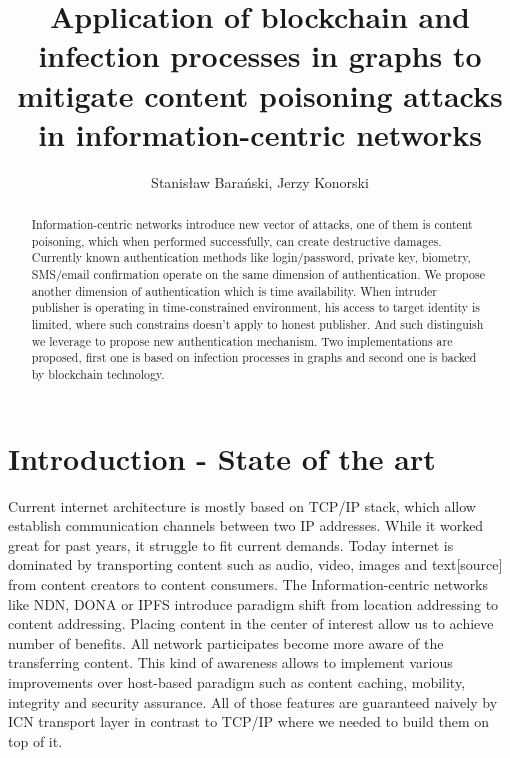 \documentclass[runningheads]{llncs}
\begin{document}
\title{Application of blockchain and infection processes in graphs to
mitigate content poisoning attacks in information-centric networks}
\author{Stanisław Barański, Jerzy Konorski}
\maketitle
\begin{abstract}
Information-centric networks introduce new vector of attacks, one of them is content poisoning, which when performed successfully, can create destructive damages. Currently known authentication methods like login/password, private key, biometry, SMS/email confirmation operate on the same dimension of authentication. We propose another dimension of authentication which is time availability. When intruder publisher is operating in time-constrained environment, his access to target identity is limited, where such constrains doesn't apply to honest publisher. And such distinguish we leverage to propose new authentication mechanism. Two implementations are proposed, first one is based on infection processes in graphs and second one is backed by blockchain technology. 

\end{abstract}

\section{Introduction - State of the art}
Current internet architecture is mostly based on TCP/IP stack, which allow  establish communication channels between two IP addresses. While it worked great for past years,  it struggle to fit current demands. Today internet is dominated by transporting content such as audio, video, images and text[source] from content creators to content consumers.
The Information-centric networks like NDN, DONA or IPFS \cite{benet2014ipfs} introduce paradigm shift from location addressing to content addressing. Placing content in the center of interest allow us to achieve number of benefits. All network participates become more aware of the transferring content. This kind of awareness allows to implement various improvements over host-based paradigm such as content caching, mobility, integrity and security assurance. All of those features are guaranteed naively by ICN transport layer in contrast to TCP/IP where we needed to build them on top of it.
\end{document}
